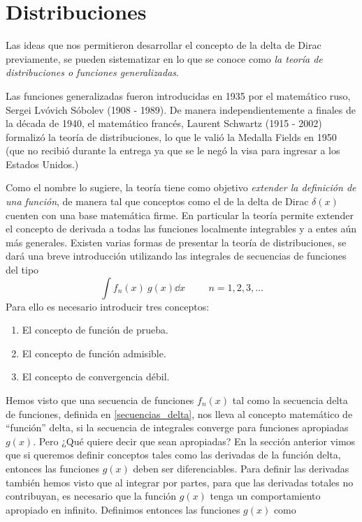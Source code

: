 \section{Distribuciones}
Las ideas que nos permitieron desarrollar el concepto de la delta de Dirac previamente, se pueden sistematizar en lo que se conoce como \emph{la teoría de distribuciones o funciones generalizadas}.
\par
Las funciones generalizadas fueron introducidas en 1935 por el matemático ruso, Sergei Lvóvich Sóbolev (1908 - 1989). De manera independientemente a finales de la década de 1940, el matemático francés, Laurent Schwartz (1915 - 2002) formalizó la teoría de distribuciones, lo que le valió la Medalla Fields en 1950 (que no recibió durante la entrega ya que se le negó la visa para ingresar a los Estados Unidos.)
\par
Como el nombre lo sugiere, la teoría tiene como objetivo  \emph{extender la definición de una función}, de manera tal que conceptos como el de la delta de Dirac $\delta (x)$ cuenten con una base matemática firme. En particular la teoría permite extender el concepto de derivada a todas las funciones localmente integrables y a entes aún más generales. Existen varias formas de presentar la teoría de distribuciones, se dará una breve introducción utilizando las integrales de secuencias de funciones del tipo
\begin{equation}
\int f_{n}(x) \: g(x) \dd{x} \hspace{1cm} n = 1, 2, 3 , \ldots
\label{eq:ecuacion_1_99}
\end{equation}
Para ello es necesario introducir tres conceptos:
\begin{enumerate}
\item El concepto de función de prueba.
\item El concepto de función admisible.
\item El concepto de convergencia débil.
\end{enumerate}
Hemos visto que una secuencia de funciones $f_{n}(x)$ tal como la secuencia delta de funciones, definida en \ref{secuencias_delta}, nos lleva al concepto matemático de \enquote{función} delta, si la secuencia de integrales converge para funciones apropiadas $g(x)$. Pero ¿Qué quiere decir que sean apropiadas? En la sección anterior vimos que si queremos definir conceptos tales como las derivadas de la función delta, entonces las funciones $g(x)$ deben ser diferenciables. Para definir las derivadas también hemos visto que al integrar por partes, para que las derivadas totales no contribuyan, es necesario que la función $g(x)$ tenga un comportamiento apropiado en infinito. Definimos entonces las funciones $g(x)$ como

